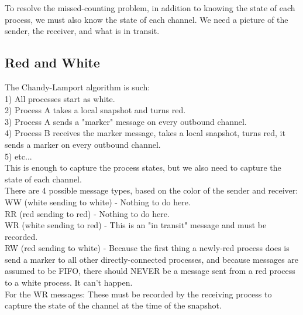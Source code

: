 \documentclass[twoside]{article}
\begin{document}
To resolve the missed-counting problem, in addition to knowing the state of each process, we must also know the state of each channel.  We need a picture of the sender, the receiver, and what is in transit.



\subsection{Red and White}

The Chandy-Lamport algorithm is such:\\

1) All processes start as white.\\
2) Process A takes a local snapshot and turns red.\\
3) Process A sends a "marker" message on every outbound channel.\\
4) Process B receives the marker message, takes a local snapshot, turns red, it sends a marker on every outbound channel.\\
5) etc...\\

This is enough to capture the process states, but we also need to capture the state of each channel.\\

There are 4 possible message types, based on the color of the sender and receiver:\\
WW (white sending to white) - Nothing to do here.\\
RR (red sending to red) - Nothing to do here.\\
WR (white sending to red) - This is an "in transit" message and must be recorded.\\
RW (red sending to white) - Because the first thing a newly-red process does is send a marker to all other directly-connected processes, and because messages are assumed to be FIFO, there should NEVER be a message sent from a red process to a white process.  It can't happen.\\

For the WR messages:  These must be recorded by the receiving process to capture the state of the channel at the time of the snapshot.
  
\end{document}

